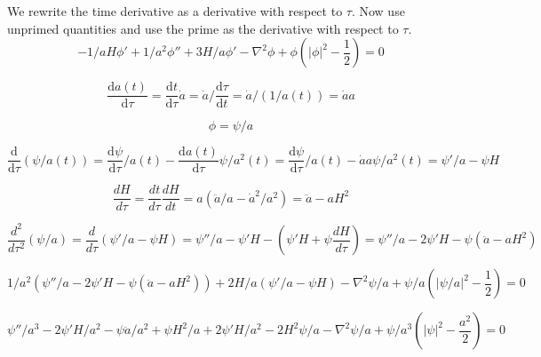 \documentclass[a4paper]{article}
\begin{document}
We rewrite the time derivative as a derivative with respect to $\tau$.
Now use unprimed quantities and use the prime as the derivative with respect to $\tau$.
\begin{equation}
    - 1/a H \phi' + 1/a^2 \phi'' + 3 H / a \phi'
    - \nabla^2 \phi + \phi \left( |\phi|^2 - \frac{1}{2} \right) = 0
\end{equation}

\begin{equation}
    \frac{\mathrm{d} a(t)}{\mathrm{d} \tau} = \frac{\mathrm{d} t}{\mathrm{d} \tau} \dot{a} = \dot{a} / \frac{\mathrm{d} \tau}{\mathrm{d} t} = \dot{a} / (1 / a(t)) = \dot{a} a
\end{equation}

\begin{equation}
    \phi = \psi / a
\end{equation}

\begin{equation}
    \frac{\mathrm{d}}{\mathrm{d} \tau} ( \psi / a(t) ) = \frac{\mathrm{d} \psi}{\mathrm{d} \tau} / a(t) - \frac{\mathrm{d} a(t)}{\mathrm{d} \tau} \psi / a^2(t)
    = \frac{\mathrm{d} \psi}{\mathrm{d} \tau} / a(t) - \dot{a} a \psi / a^2(t)
    = \psi' / a - \psi H
\end{equation}

\begin{equation}
    \frac{d H}{d \tau} = \frac{d t}{d \tau} \frac{d H}{d t} = a (\ddot{a} / a - \dot{a}^2 / a^2) = \ddot{a} - a H^2
\end{equation}

\begin{equation}
    \frac{d^2}{d \tau^2} (\psi / a) = \frac{d}{d \tau} (\psi' / a - \psi H)
    = \psi'' / a - \psi' H - (\psi' H + \psi \frac{d H}{d \tau})
    = \psi'' / a - 2 \psi' H - \psi ( \ddot{a} - a H^2 )
\end{equation}

\begin{equation}
    1/a^2 ( \psi'' / a - 2 \psi' H - \psi ( \ddot{a} - a H^2 ) ) + 2 H / a (\psi' / a - \psi H)
    - \nabla^2 \psi / a + \psi / a \left( |\psi / a|^2 - \frac{1}{2} \right) = 0
\end{equation}

\begin{equation}
    \psi'' / a^3 - 2 \psi' H / a^2 - \psi \ddot{a} / a^2 + \psi H^2 / a
    + 2 \psi' H / a^2 - 2 H^2 \psi / a
    - \nabla^2 \psi / a + \psi / a^3 ( |\psi|^2 - \frac{a^2}{2} ) = 0
\end{equation}
\end{document}
